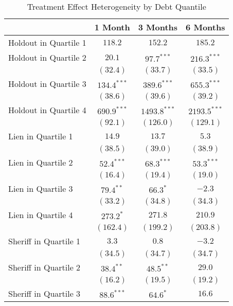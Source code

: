 \begin{table}[htb]
\caption{Treatment Effect Heterogeneity by Debt Quantile}
\begin{center}
\begin{tabular}{l c c c }
\hline
 & 1 Month & 3 Months & 6 Months \\
\hline
Holdout in Quartile 1 & $118.2$ & $152.2$  & $185.2$  \\
\hline
Holdout in Quartile 2 & $20.1$        & $97.7^{***}$   & $216.3^{***}$  \\
                      & $(32.4)$      & $(33.7)$       & $(33.5)$       \\
Holdout in Quartile 3 & $134.4^{***}$ & $389.6^{***}$  & $655.3^{***}$  \\
                      & $(38.6)$      & $(39.6)$       & $(39.2)$       \\
Holdout in Quartile 4 & $690.9^{***}$ & $1493.8^{***}$ & $2193.5^{***}$ \\
                      & $(92.1)$      & $(126.0)$      & $(129.1)$      \\
Lien in Quartile 1    & $14.9$        & $13.7$         & $5.3$          \\
                      & $(38.5)$      & $(39.0)$       & $(38.9)$       \\
Lien in Quartile 2    & $52.4^{***}$  & $68.3^{***}$   & $53.3^{***}$   \\
                      & $(16.4)$      & $(19.4)$       & $(19.0)$       \\
Lien in Quartile 3    & $79.4^{**}$   & $66.3^{*}$     & $-2.3$         \\
                      & $(33.2)$      & $(34.8)$       & $(34.3)$       \\
Lien in Quartile 4    & $273.2^{*}$   & $271.8$        & $210.9$        \\
                      & $(162.4)$     & $(199.2)$      & $(203.8)$      \\
Sheriff in Quartile 1 & $3.3$         & $0.8$          & $-3.2$         \\
                      & $(34.5)$      & $(34.7)$       & $(34.7)$       \\
Sheriff in Quartile 2 & $38.4^{**}$   & $48.5^{**}$    & $29.0$         \\
                      & $(16.2)$      & $(19.5)$       & $(19.2)$       \\
Sheriff in Quartile 3 & $88.6^{***}$  & $64.6^{*}$     & $16.6$         \\

\end{tabular}
\end{center}
\end{table}
